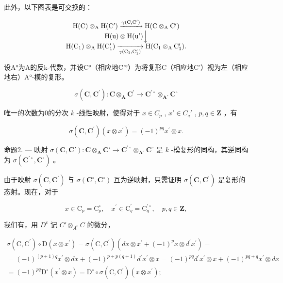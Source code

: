 此外，以下图表是可交换的：

\[
\begin{array}{c} \mathrm{H(C)} \otimes_ {\mathrm{A}} \mathrm {H(C^ {\prime})} \xrightarrow {\gamma (\mathrm{C,C} ^ {\prime})} \mathrm{H(C} \otimes_ {\mathrm{A}} \mathrm {C^ {\prime}}) \\ \mathrm{H(u)} \otimes \mathrm {H(u^{\prime})} \Big \downarrow \\ \mathrm {H(C_ {1})} \otimes_ {\mathrm{A}} \mathrm {H(C_ {1} ^ {\prime})} \xrightarrow [ \gamma (\mathrm {C_ {1}} , \mathrm {C_ {1} ^ {\prime}}) ]{} \mathrm {H(C_ {1}} \otimes_ {\mathrm{A}} \mathrm {C_ {1} ^ {\prime}}). \end{array}
\]

设A°为A的反k-代数，并设C°（相应地C'°）为将复形C（相应地C'）视为左（相应地右）A°-模的复形。

\[
\sigma (\mathbf {C}, \mathbf {C} ^ {\prime}): \mathbf {C} \otimes_ {\mathbf {A}} \mathbf {C} ^ {\prime} \rightarrow \mathbf {C} ^ {\prime \circ} \otimes_ {\mathbf {A} ^ {\circ}} \mathbf {C} ^ {\circ}
\]

唯一的次数为0的分次 \(k\) -线性映射，使得对于 \(x \in C_p\) , \(x' \in C_q'\) , \(p, q \in \mathbf{Z}\) ，有

\[
\sigma (\mathbf {C}, \mathbf {C} ^ {\prime}) (x \otimes x ^ {\prime}) = (- 1) ^ {p q} x ^ {\prime} \otimes x.
\]

命题2. — 映射 \(\sigma(\mathbf{C},\mathbf{C}'):\mathbf{C}\otimes_{\mathbf{A}}\mathbf{C}'\to\mathbf{C}^{\prime\circ}\otimes_{\mathbf{A}^{\circ}}\mathbf{C}^{\circ}\) 是 \(k\) -模复形的同构，其逆同构为 \(\sigma(\mathbf{C}^{\prime\circ},\mathbf{C}^{\circ})\) 。

由于映射 \(\sigma(\mathbf{C},\mathbf{C}^{\prime})\) 与 \(\sigma(\mathbf{C}^{\circ},\mathbf{C}^{\circ})\) 互为逆映射，只需证明 \(\sigma(\mathbf{C},\mathbf{C}^{\prime})\) 是复形的态射。现在，对于

\[
x \in \mathrm{C} _ {p} = \mathrm{C} _ {p} ^ {\circ}, \quad x ^ {\prime} \in \mathrm{C} _ {q} ^ {\prime} = \mathrm{C} _ {q} ^ {\prime \circ}, \quad p, q \in \mathbf {Z},
\]

我们有，用 \(D^{c}\) 记 \(C' \otimes_{A^{0}} C\) 的微分，

\[
\begin{array}{l} \sigma (\mathrm{C}, \mathrm{C} ^ {\prime}) \circ \mathrm{D} (x \otimes x ^ {\prime}) = \sigma (\mathrm{C}, \mathrm{C} ^ {\prime}) (d x \otimes x ^ {\prime} + (- 1) ^ {p} x \otimes d ^ {\prime} x ^ {\prime}) = \\ = (- 1) ^ {(p + 1) q} x ^ {\prime} \otimes d x + (- 1) ^ {p + p (q + 1)} d ^ {\prime} x ^ {\prime} \otimes x = (- 1) ^ {p q} d ^ {\prime} x ^ {\prime} \otimes x + (- 1) ^ {p q + q} x ^ {\prime} \otimes d x \\ = (- 1) ^ {p q} \mathrm{D} ^ {\circ} (x ^ {\prime} \otimes x) = \mathrm{D} ^ {\circ} \circ \sigma (\mathrm{C}, \mathrm{C} ^ {\prime}) (x \otimes x ^ {\prime}); \end{array}
\]

